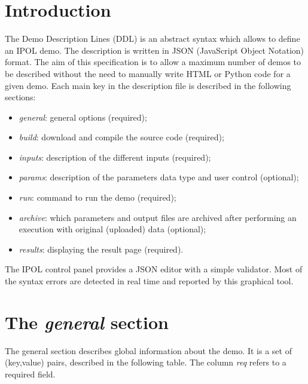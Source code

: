 \section{Introduction}
The Demo Description Lines (DDL) is an abstract syntax which allows
to define an IPOL demo. The description is 
written in JSON (JavaScript Object Notation) format. The aim of this specification is to allow a maximum number of demos to be described without the
need to manually write HTML or Python code for a given demo. Each main key in the description file is described in the following sections:

\begin{itemize}
  \item \textit{general}: general options (required);
  \item \textit{build}: download and compile the source code (required);
  \item \textit{inputs}: description of the different inputs  (required);
  \item \textit{params}: description of the parameters data type and user control (optional);
  \item \textit{run}: command to run the demo (required);
  \item \textit{archive}: which parameters and output files are archived after performing an execution with original (uploaded) data (optional);
  \item \textit{results}: displaying the result page (required).
\end{itemize}

\vspace{1em}

The IPOL control panel provides a JSON editor with a simple validator. Most of the syntax errors are detected in real time
and reported by this graphical tool.

\section{The \emph{general} section}
The general section describes global information about the demo.
It is a set of (key,value) pairs, described in the following table. The column \emph{req} refers to a required field.

